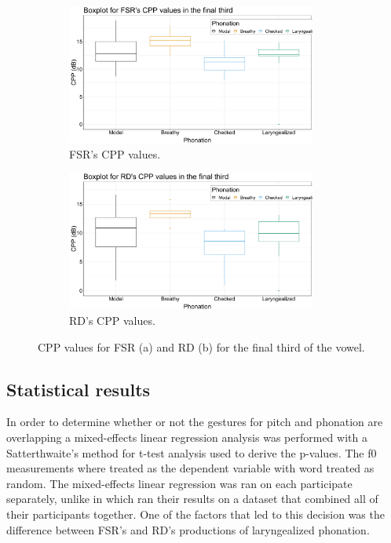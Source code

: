 \documentclass[12pt, letterpaper]{article}
\begin{document}
\begin{figure}[!ht]
	\centering
	\begin{subfigure}{.5\textwidth}
		\centering
		\includegraphics[width=0.9\textwidth]{../mean_FSR_cpp_third.png}
		\caption{FSR's CPP values.}
		\label{fig:FSRcppthird} 
	\end{subfigure}%
	\begin{subfigure}{.5\textwidth}
		\centering
		\includegraphics[width=0.9\textwidth]{../mean_RD_cpp_third.png}
		\caption{RD's CPP values.}
		\label{fig:RDcppthird} 
	\end{subfigure}
	\caption{CPP values for FSR (a) and RD (b) for the final third of the vowel. }
	\label{fig:cppthird}
\end{figure}


\subsection{Statistical results} \label{sec:Stats}

In order to determine whether or not the gestures for pitch and phonation are overlapping a mixed-effects linear regression analysis was performed with a Satterthwaite's method for t-test analysis used to derive the p-values. The f0 measurements where treated as the dependent variable with word treated as random. The mixed-effects linear regression was ran on each participate separately, unlike in \citet{garellekAcousticConsequencesPhonation2011,dicanioCoarticulationToneGlottal2012} which ran their results on a dataset that combined all of their participants together. One of the factors that led to this decision was the difference between FSR's and RD's productions of laryngealized phonation.
\end{document}
